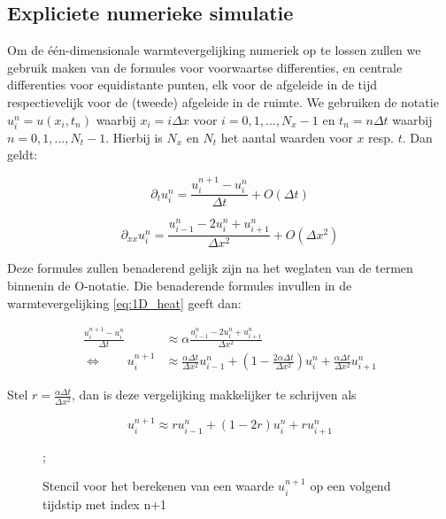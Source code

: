 \documentclass[a4paper,kulak]{kulakarticle} %
\newcommand{\stencilpt}[4][]{\node[circle,fill,draw,inner sep=1.5pt,label={above left:#4},#1] at (#2) (#3) {}}
\begin{document}
\subsection{Expliciete numerieke simulatie}

Om de één-dimensionale warmtevergelijking numeriek op te lossen zullen we gebruik maken van de formules voor voorwaartse differenties, en centrale differenties voor equidistante punten, elk voor de afgeleide in de tijd respectievelijk voor de (tweede) afgeleide in de ruimte. %
We gebruiken de notatie $u_i^n = u(x_i, t_n)$ waarbij $x_i = i\Delta x$ voor $i = 0, 1, ..., N_x-1$ en $t_n = n\Delta t$ waarbij $n = 0, 1, ..., N_t - 1$. Hierbij is $N_x$ en $N_t$ het aantal waarden voor $x$ resp. $t$.
Dan geldt:

\begin{equation}
	\partial_t u_i^n = \frac{u_i^{n+1} - u_i^n}{\Delta t} + O(\Delta t)
	\label{eq:diff_time}
\end{equation}

\begin{equation}
	\partial_{xx} u_i^n = \frac{u_{i-1}^n - 2 u_i^n + u_{i+1}^n}{\Delta x^2} + O(\Delta x^2)
	\label{eq:diff_space}
\end{equation}

Deze formules zullen benaderend gelijk zijn na het weglaten van de termen binnenin de O-notatie. Die benaderende formules invullen in de warmtevergelijking \ref{eq:1D_heat} geeft dan:

\begin{align*}
	\frac{u_i^{n+1} - u_i^n}{\Delta t} &\approx \alpha \frac{u_{i-1}^n - 2 u_i^n + u_{i+1}^n}{\Delta x^2} \\
	\Leftrightarrow \qquad u_i^{n+1} &\approx \frac{\alpha \Delta t}{\Delta x^2} u_{i-1}^n + \left( 1 - \frac{2 \alpha \Delta t}{\Delta x^2} \right) u_i^n + \frac{\alpha \Delta t}{\Delta x^2} u_{i+1}^n 
\end{align*}

Stel $r = \frac{\alpha \Delta t}{\Delta x^2}$, dan is deze vergelijking makkelijker te schrijven als

\begin{equation}
	u_i^{n+1} \approx r u_{i-1}^n + \left( 1 - 2r \right) u_i^n + r u_{i+1}^n 
\end{equation}

\begin{figure}
\centering
{}
\label{fig:stencil_diff};
\caption{Stencil voor het berekenen van een waarde $u_i^{n+1}$ op een volgend tijdstip met index n+1}
\end{figure}
\end{document}

